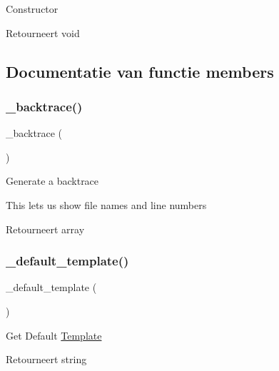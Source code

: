 Constructor

\begin{DoxyReturn}{Retourneert}
void 
\end{DoxyReturn}


\subsection{Documentatie van functie members}
\mbox{\label{class_c_i___unit__test_aae40ff64c7daf1d70efaf110181a257e}} 
\subsubsection{\texorpdfstring{\_backtrace()}{\_backtrace()}}
{\footnotesize\ttfamily \+\_\+backtrace (\begin{DoxyParamCaption}{ }\end{DoxyParamCaption})\hspace{0.3cm}{\ttfamily [protected]}}

Generate a backtrace

This lets us show file names and line numbers

\begin{DoxyReturn}{Retourneert}
array 
\end{DoxyReturn}
\mbox{\label{class_c_i___unit__test_ae1990fcb9ffc455614eeac9a1091f0b0}} 
\subsubsection{\texorpdfstring{\_default\_template()}{\_default\_template()}}
{\footnotesize\ttfamily \+\_\+default\+\_\+template (\begin{DoxyParamCaption}{ }\end{DoxyParamCaption})\hspace{0.3cm}{\ttfamily [protected]}}

Get Default \mbox{\hyperlink{class_template}{Template}}

\begin{DoxyReturn}{Retourneert}
string 
\end{DoxyReturn}
\mbox{\label{class_c_i___unit__test_a884e99b431f75c1ad17ba9753dab3b49}} 

